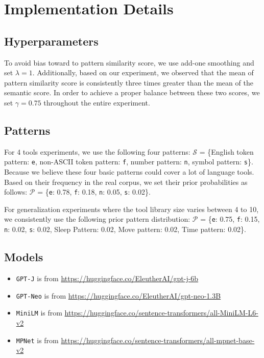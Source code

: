 \documentclass[11pt]{article}
\newcommand{\gptj}{{\tt \textcolor{darkredTwo}{GPT-J}}}
\newcommand{\gptNeo}{{\tt \textcolor{darkblueTwo}{GPT-Neo}}}
\newcommand{\miniLM}{{\tt \textcolor{darkblueTwo}{MiniLM}}}
\newcommand{\mpnet}{{\tt \textcolor{darkblueTwo}{MPNet}}}
\begin{document}
\clearpage
\section{Implementation Details}
\label{Appendix:implementation details}
\subsection{Hyperparameters}
\label{Appendix:hyperparameters}
To avoid bias toward to pattern similarity score, we use add-one smoothing and set $\lambda = 1$. Additionally, based on our experiment, we observed that the mean of pattern similarity score is consistently three times greater than the mean of the semantic score. In order to achieve a proper balance between these two scores, we set $\gamma=0.75$ throughout the entire experiment. 

\subsection{Patterns}
\label{Appendix: patterns setup}
For 4 tools experiments, we use the following four patterns: $\mathcal{S}$ = \{English token pattern: \texttt{e}, non-ASCII token pattern: \texttt{f}, number pattern: \texttt{n}, symbol pattern: \texttt{s}\}. Because we believe these four basic patterns could cover a lot of language tools. Based on their frequency in the real corpus, we set their prior probabilities as follows: $\mathcal{P}$ = \{\texttt{e}: 0.78, \texttt{f}: 0.18, \texttt{n}: 0.05, \texttt{s}: 0.02\}.

For generalization experiments where the tool library size varies between 4 to 10, we consistently use the following prior pattern distribution: $\mathcal{P}$ = \{\texttt{e}: 0.75, \texttt{f}: 0.15, \texttt{n}: 0.02, \texttt{s}: 0.02, Sleep Pattern: 0.02, Move pattern: 0.02, Time pattern: 0.02\}. 
\subsection{Models}
\label{Appendix: Model Preparation}
\begin{itemize}[leftmargin=0.1in]
    \item \gptj{} is from \url{https://huggingface.co/EleutherAI/gpt-j-6b}
    \item \gptNeo{} is from \url{https://huggingface.co/EleutherAI/gpt-neo-1.3B}
    \item \miniLM{} is from \url{https://huggingface.co/sentence-transformers/all-MiniLM-L6-v2}
    \item \mpnet{} is from \url{https://huggingface.co/sentence-transformers/all-mpnet-base-v2}
\end{itemize}
\end{document}
